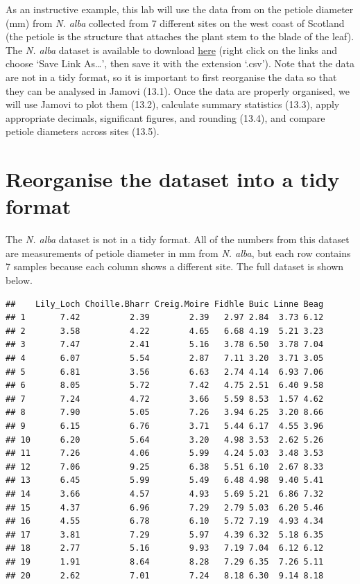 \documentclass[
]{scrbook}
\begin{document}
As an instructive example, this lab will use the data from \citet{Law2014} on the petiole diameter (mm) from \emph{N. alba} collected from 7 different sites on the west coast of Scotland (the petiole is the structure that attaches the plant stem to the blade of the leaf).
The \emph{N. alba} dataset is available to download \href{https://raw.githubusercontent.com/bradduthie/SCIU4T4/main/data/Nymphaea_alba.csv}{here} (right click on the links and choose `Save Link As\ldots{}', then save it with the extension `.csv').
Note that the data are not in a tidy format, so it is important to first reorganise the data so that they can be analysed in Jamovi (13.1).
Once the data are properly organised, we will use Jamovi to plot them (13.2), calculate summary statistics (13.3), apply appropriate decimals, significant figures, and rounding (13.4), and compare petiole diameters across sites (13.5).

\hypertarget{reorganise-the-dataset-into-a-tidy-format}{%
\section{Reorganise the dataset into a tidy format}\label{reorganise-the-dataset-into-a-tidy-format}}

The \emph{N. alba} dataset is not in a tidy format.
All of the numbers from this dataset are measurements of petiole diameter in mm from \emph{N. alba}, but each row contains 7 samples because each column shows a different site.
The full dataset is shown below.

\begin{verbatim}
##    Lily_Loch Choille.Bharr Creig.Moire Fidhle Buic Linne Beag
## 1       7.42          2.39        2.39   2.97 2.84  3.73 6.12
## 2       3.58          4.22        4.65   6.68 4.19  5.21 3.23
## 3       7.47          2.41        5.16   3.78 6.50  3.78 7.04
## 4       6.07          5.54        2.87   7.11 3.20  3.71 3.05
## 5       6.81          3.56        6.63   2.74 4.14  6.93 7.06
## 6       8.05          5.72        7.42   4.75 2.51  6.40 9.58
## 7       7.24          4.72        3.66   5.59 8.53  1.57 4.62
## 8       7.90          5.05        7.26   3.94 6.25  3.20 8.66
## 9       6.15          6.76        3.71   5.44 6.17  4.55 3.96
## 10      6.20          5.64        3.20   4.98 3.53  2.62 5.26
## 11      7.26          4.06        5.99   4.24 5.03  3.48 3.53
## 12      7.06          9.25        6.38   5.51 6.10  2.67 8.33
## 13      6.45          5.99        5.49   6.48 4.98  9.40 5.41
## 14      3.66          4.57        4.93   5.69 5.21  6.86 7.32
## 15      4.37          6.96        7.29   2.79 5.03  6.20 5.46
## 16      4.55          6.78        6.10   5.72 7.19  4.93 4.34
## 17      3.81          7.29        5.97   4.39 6.32  5.18 6.35
## 18      2.77          5.16        9.93   7.19 7.04  6.12 6.12
## 19      1.91          8.64        8.28   7.29 6.35  7.26 5.11
## 20      2.62          7.01        7.24   8.18 6.30  9.14 8.18
\end{verbatim}
\end{document}
